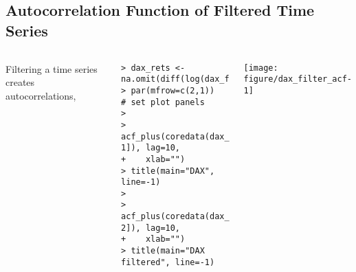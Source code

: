 \documentclass[10pt]{beamer}\usepackage[]{graphicx}\usepackage[]{color}
\makeatletter
\newenvironment{kframe}{%
 \def\at@end@of@kframe{}%
 \ifinner\ifhmode%
  \def\at@end@of@kframe{\end{minipage}}%
  \begin{minipage}{\columnwidth}%
 \fi\fi%
 \def\FrameCommand##1{\hskip\@totalleftmargin \hskip-\fboxsep
 \colorbox{shadecolor}{##1}\hskip-\fboxsep
     \hskip-\linewidth \hskip-\@totalleftmargin \hskip\columnwidth}%
 \MakeFramed {\advance\hsize-\width
   \@totalleftmargin\z@ \linewidth\hsize
   \@setminipage}}%
 {\par\unskip\endMakeFramed%
 \at@end@of@kframe}
\newenvironment{knitrout}{}{} %
\makeatother
\begin{document}
\subsection{Autocorrelation Function of Filtered Time Series}
\begin{frame}[fragile,t]{\subsecname}
\vspace{-1em}
\begin{block}{}
  \begin{columns}[T]
      Filtering a time series creates autocorrelations,
\begin{knitrout}\scriptsize
{}\color{fgcolor}\begin{kframe}
\begin{verbatim}
> dax_rets <- na.omit(diff(log(dax_filt)))
> par(mfrow=c(2,1))  # set plot panels
> 
> acf_plus(coredata(dax_rets[, 1]), lag=10,
+    xlab="")
> title(main="DAX", line=-1)
> 
> acf_plus(coredata(dax_rets[, 2]), lag=10,
+    xlab="")
> title(main="DAX filtered", line=-1)
\end{verbatim}
\end{kframe}
\end{knitrout}
      \vspace{-2em}
      \texttt{[image: figure/dax\_filter\_acf-1]}
  \end{columns}
\end{block}

\end{frame}


\end{document}
